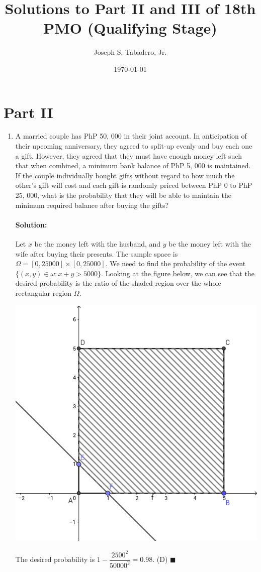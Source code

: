 \documentclass{article}
\title{Solutions to Part II and III of 18th PMO (Qualifying Stage)}
\author{Joseph S. Tabadero, Jr.}
\date{\today}
\newenvironment{solution}{\paragraph{Solution:}}{\hfill$\blacksquare$}
\begin{document}
	\maketitle
	
	
	\section*{Part II}
	
	\begin{enumerate}
		\item A married couple has PhP 50, 000 in their joint account. In anticipation of their upcoming
		anniversary, they agreed to split-up evenly and buy each one a gift. However, they agreed
		that they must have enough money left such that when combined, a minimum bank balance
		of PhP 5, 000 is maintained. If the couple individually bought gifts without regard to how
		much the other’s gift will cost and each gift is randomly priced between PhP 0 to PhP
		25, 000, what is the probability that they will be able to maintain the minimum required
		balance after buying the gifts?
		
		
		\begin{solution}
			Let $x$ be the money left with the husband, and $y$ be the money left with the wife after buying their presents. The sample space is $\Omega = [0,25000]\times [0,25000]$. We need to find the probability of the event $\{(x,y)\in \omega: x+y > 5000\}$. Looking at the figure below, we can see that the desired probability is the ratio of the shaded region over the whole rectangular region $\Omega$.
			
			\includegraphics[width=0.6\linewidth]{part3_1}
			
			The desired probability is $1-\dfrac{2500^2}{50000^2}=0.98$. (D)
		\end{solution}
	

\end{enumerate}
\end{document}
